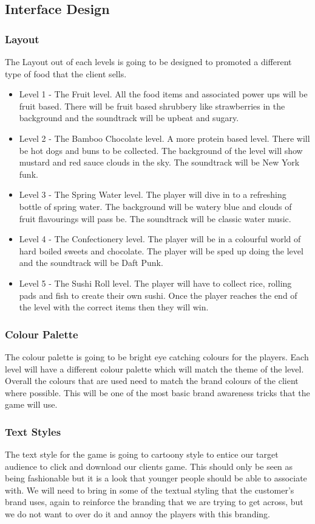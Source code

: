 \documentclass{article}
\begin{document}
\subsection{Interface Design}
\subsubsection{Layout}
The Layout out of each levels is going to be designed to promoted a different type of food that the client sells. 
\begin{itemize}
	\item Level 1 - The Fruit level. All the food items and associated power ups will be fruit based. There will be fruit based shrubbery like strawberries in the background and the soundtrack will be upbeat and sugary.
	\item Level 2 - The Bamboo Chocolate level. A more protein based level. There will be hot dogs and buns to be collected. The background of the level will show mustard and red sauce clouds in the sky. The soundtrack will be New York funk.
	\item Level 3 - The Spring Water level. The player will dive in to a refreshing bottle of spring water. The background will be watery blue and clouds of fruit flavourings will pass be. The soundtrack will be classic water music.
	\item Level 4 - The Confectionery level. The player will be in a colourful world of hard boiled sweets and chocolate. The player will be sped up doing the level and the soundtrack will be Daft Punk.
	\item Level 5 - The Sushi Roll level. The player will have to collect rice, rolling pads and fish to create their own sushi. Once the player reaches the end of the level with the correct items then they will win.
\end{itemize}

\subsubsection{Colour Palette}
The colour palette is going to be bright eye catching colours for the players. Each level will have a different colour palette which will match the theme of the level.
Overall the colours that are used need to match the brand colours of the client where possible. This will be one of the most basic brand awareness tricks that the game will use.

\subsubsection{Text Styles}
The text style for the game is going to cartoony style to entice our target audience to click and download our clients game. This should only be seen as being fashionable but it is a look that younger people should be able to associate with. We will need to bring in some of the textual styling that the customer's brand uses, again to reinforce the branding that we are trying to get across, but we do not want to over do it and annoy the players with this branding.
\end{document}
